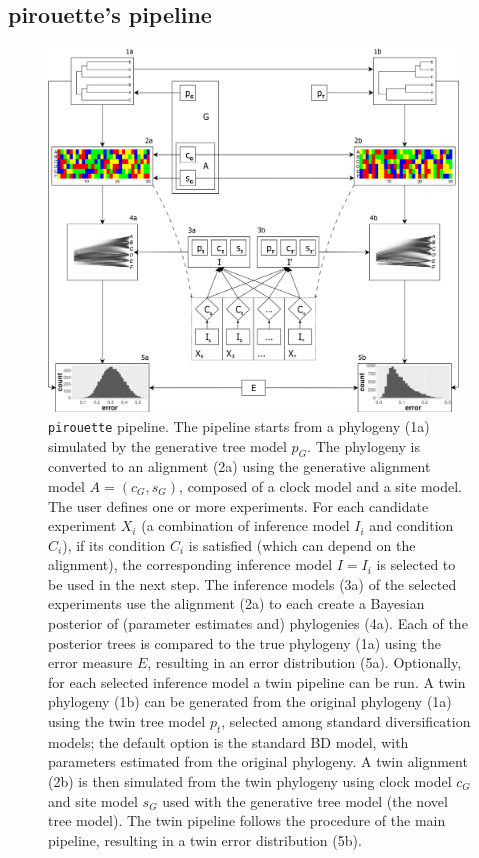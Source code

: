 \subsection{pirouette's pipeline}
\label{subsec:pipeline}

\begin{figure}
  \centering
  \includegraphics[width = 0.97\textwidth]{workflow4.png}
  \caption{
    \texttt{pirouette} pipeline.
    The pipeline starts from a phylogeny (1a) simulated by the 
    generative tree model 
    $\mathit{p_{G}}$.
    The phylogeny is converted to an alignment (2a) using the generative 
    alignment model 
    $\mathit{A} = (\mathit{c_{G}}, \mathit{s_{G}})$, composed of a clock model 
    and a site model. 
    The user defines one or more experiments.
    For each candidate experiment $\mathit{X_{i}}$ 
    (a combination of inference model $\mathit{I_{i}}$ and condition $\mathit{C_{i}}$),
    if its condition $\mathit{C_{i}}$ is 
    satisfied (which can depend on the alignment), 
    the corresponding inference model $\mathit{I} = \mathit{I_{i}}$ is selected
    to be used in the next step.
    The inference models (3a) of the selected experiments use the alignment (2a) 
    to each create a Bayesian posterior of (parameter estimates and) 
    phylogenies (4a). 
    Each of the posterior trees is compared to the true phylogeny (1a) 
    using the error measure $\mathit{E}$, 
    resulting in an error distribution (5a). 
    Optionally, for each selected inference model a twin pipeline can be run.
    A twin phylogeny (1b) can be generated from the original 
    phylogeny (1a) using the twin tree model $\mathit{p_{t}}$, 
    selected among standard diversification models; 
    the default option is the standard BD model, 
    with parameters estimated from the original phylogeny.
    A twin alignment (2b) is then simulated from the twin phylogeny 
    using clock model $\mathit{c_{G}}$ and site model $\mathit{s_{G}}$ 
    used with the generative tree model (the novel tree model).
    The twin pipeline follows the procedure of the main pipeline, 
    resulting in a twin error distribution (5b).
  }
  \label{fig:pipeline}
\end{figure}

